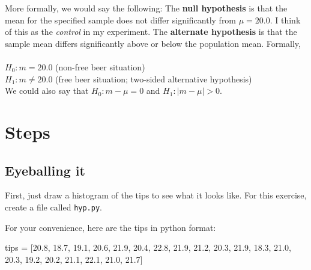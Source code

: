 \begin{fullwidth}
More formally, we would say the following: The {\bf null hypothesis} is that the mean for the specified sample does not differ significantly from $\mu = 20.0$.  I think of this as the {\em control} in my experiment. The {\bf alternate hypothesis} is that the sample mean differs significantly above or below the population mean.  Formally,\\
~\\
$H_0: m = 20.0$ (non-free beer situation)\\
$H_1: m \neq 20.0$ (free beer situation; two-sided alternative hypothesis)\\

\noindent We could also say that $H_0: m - \mu = 0$ and $H_1: |m-\mu| > 0$.

\section{Steps}

\subsection{Eyeballing it}

\step First, just draw a histogram of the tips to see what it looks like. For this exercise, create a file called {\tt hyp.py}.


For your convenience, here are the tips in python format:

\begin{pyverbatim}
tips = [20.8, 18.7, 19.1, 20.6, 21.9, 20.4, 22.8,
        21.9, 21.2, 20.3, 21.9, 18.3, 21.0, 20.3,
        19.2, 20.2, 21.1, 22.1, 21.0, 21.7]
\end{pyverbatim}


\end{fullwidth}

